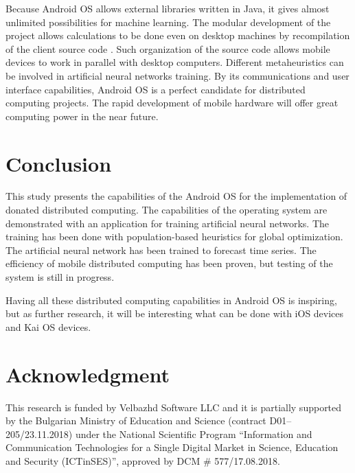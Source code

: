 \documentclass[a4paper,conference]{IEEEtran}
\begin{document}
Because Android OS allows external libraries written in Java, it gives almost unlimited possibilities for machine learning. The modular development of the project allows calculations to be done even on desktop machines by recompilation of the client source code \cite{Balabanov-01}. Such organization of the source code allows mobile devices to work in parallel with desktop computers. Different metaheuristics can be involved in artificial neural networks training. By its communications and user interface capabilities, Android OS is a perfect candidate for distributed computing projects. The rapid development of mobile hardware will offer great computing power in the near future. 

\section{Conclusion}

This study presents the capabilities of the Android OS for the implementation of donated distributed computing. The capabilities of the operating system are demonstrated with an application for training artificial neural networks. The training has been done with population-based heuristics for global optimization. The artificial neural network has been trained to forecast time series. The efficiency of mobile distributed computing has been proven, but testing of the system is still in progress. 

Having all these distributed computing capabilities in Android OS is inspiring, but as further research, it will be interesting what can be done with iOS devices and Kai OS devices. 

\section*{Acknowledgment}

This research is funded by Velbazhd Software LLC and it is partially supported by the Bulgarian Ministry of Education and Science (contract D01–205/23.11.2018) under the National Scientific Program ``Information and Communication Technologies for a Single Digital Market in Science, Education and Security (ICTinSES)'', approved by DCM \# 577/17.08.2018.
\end{document}
